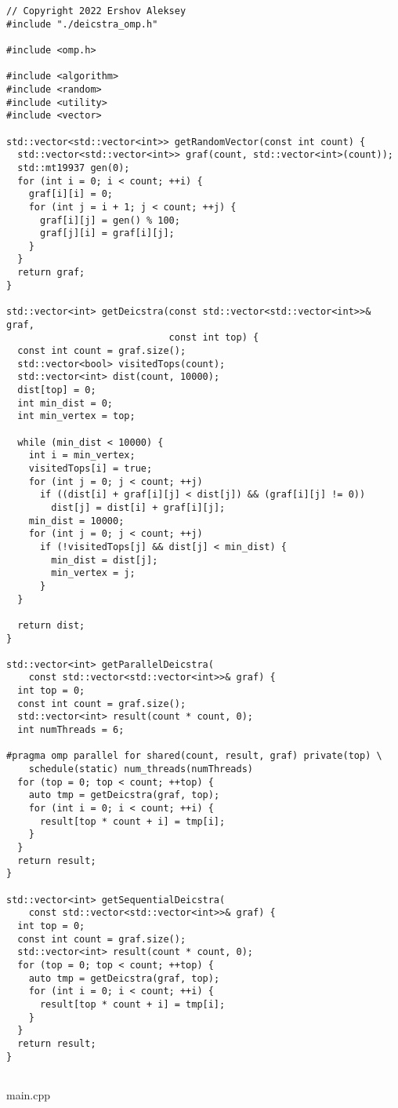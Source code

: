 \documentclass{report}
\begin{document}
\begin{lstlisting}
// Copyright 2022 Ershov Aleksey
#include "./deicstra_omp.h"

#include <omp.h>

#include <algorithm>
#include <random>
#include <utility>
#include <vector>

std::vector<std::vector<int>> getRandomVector(const int count) {
  std::vector<std::vector<int>> graf(count, std::vector<int>(count));
  std::mt19937 gen(0);
  for (int i = 0; i < count; ++i) {
    graf[i][i] = 0;
    for (int j = i + 1; j < count; ++j) {
      graf[i][j] = gen() % 100;
      graf[j][i] = graf[i][j];
    }
  }
  return graf;
}

std::vector<int> getDeicstra(const std::vector<std::vector<int>>& graf,
                             const int top) {
  const int count = graf.size();
  std::vector<bool> visitedTops(count);
  std::vector<int> dist(count, 10000);
  dist[top] = 0;
  int min_dist = 0;
  int min_vertex = top;

  while (min_dist < 10000) {
    int i = min_vertex;
    visitedTops[i] = true;
    for (int j = 0; j < count; ++j)
      if ((dist[i] + graf[i][j] < dist[j]) && (graf[i][j] != 0))
        dist[j] = dist[i] + graf[i][j];
    min_dist = 10000;
    for (int j = 0; j < count; ++j)
      if (!visitedTops[j] && dist[j] < min_dist) {
        min_dist = dist[j];
        min_vertex = j;
      }
  }

  return dist;
}

std::vector<int> getParallelDeicstra(
    const std::vector<std::vector<int>>& graf) {
  int top = 0;
  const int count = graf.size();
  std::vector<int> result(count * count, 0);
  int numThreads = 6;

#pragma omp parallel for shared(count, result, graf) private(top) \
    schedule(static) num_threads(numThreads)
  for (top = 0; top < count; ++top) {
    auto tmp = getDeicstra(graf, top);
    for (int i = 0; i < count; ++i) {
      result[top * count + i] = tmp[i];
    }
  }
  return result;
}

std::vector<int> getSequentialDeicstra(
    const std::vector<std::vector<int>>& graf) {
  int top = 0;
  const int count = graf.size();
  std::vector<int> result(count * count, 0);
  for (top = 0; top < count; ++top) {
    auto tmp = getDeicstra(graf, top);
    for (int i = 0; i < count; ++i) {
      result[top * count + i] = tmp[i];
    }
  }
  return result;
}


\end{lstlisting}
main.cpp
\end{document}

